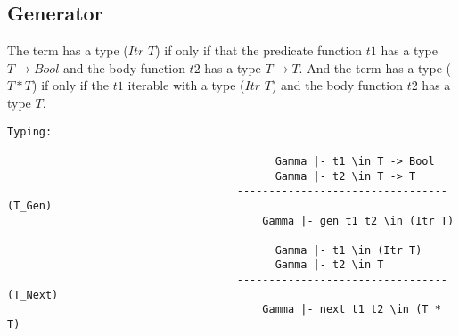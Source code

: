 \subsection{Generator}
The \gen term has a type ($Itr$ $T$) if only if that the predicate function $t1$ has a type $T \rightarrow Bool$ and the body function $t2$ has a type $T \rightarrow T$. And the \nt term has a type ($T*T$) if only if the $t1$ iterable with a type ($Itr$ $T$) and the body function $t2$ has a type $T$.
\begin{lstlisting}
Typing:

										  Gamma |- t1 \in T -> Bool
										  Gamma |- t2 \in T -> T
									---------------------------------   (T_Gen)
										Gamma |- gen t1 t2 \in (Itr T)

										  Gamma |- t1 \in (Itr T)
										  Gamma |- t2 \in T
									---------------------------------   (T_Next)
										Gamma |- next t1 t2 \in (T * T)
\end{lstlisting}